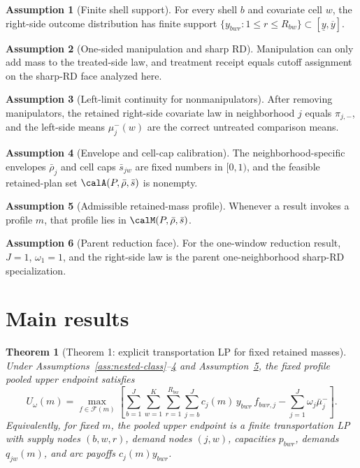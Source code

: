 \documentclass[11pt]{article}
\newcommand{\calF}{\mathcal{F}}
\theoremstyle{definition}
\newtheorem{assumption}{Assumption}
\theoremstyle{plain}
\newtheorem{theorem}{Theorem}
\theoremstyle{remark}
\begin{document}
\begin{assumption}[Finite shell support]\label{ass:finite-support}
For every shell \(b\) and covariate cell \(w\), the right-side outcome distribution has finite support
\(\{y_{bwr}:1\le r\le R_{bw}\}\subset[\underline y,\overline y]\).
\end{assumption}

\begin{assumption}[One-sided manipulation and sharp RD]\label{ass:sharp-rd}
Manipulation can only add mass to the treated-side law, and treatment receipt equals cutoff assignment on
the sharp-RD face analyzed here.
\end{assumption}

\begin{assumption}[Left-limit continuity for nonmanipulators]\label{ass:left-continuity}
After removing manipulators, the retained right-side covariate law in neighborhood \(j\) equals
\(\pi_{j,-}\), and the left-side means \(\mu^-_j(w)\) are the correct untreated comparison means.
\end{assumption}

\begin{assumption}[Envelope and cell-cap calibration]\label{ass:budgets}
The neighborhood-specific envelopes \(\bar\rho_j\) and cell caps \(\bar s_{jw}\) are fixed numbers in
\([0,1)\), and the feasible retained-plan set \(\calA(P,\bar\rho,\bar s)\) is nonempty.
\end{assumption}

\begin{assumption}[Admissible retained-mass profile]\label{ass:profile}
Whenever a result invokes a profile \(m\), that profile lies in \(\calM(P,\bar\rho,\bar s)\).
\end{assumption}

\begin{assumption}[Parent reduction face]\label{ass:parent-face}
For the one-window reduction result, \(J=1\), \(\omega_1=1\), and the right-side law is the parent
one-neighborhood sharp-RD specialization.
\end{assumption}

\section{Main results}
\begin{theorem}[Theorem 1: explicit transportation LP for fixed retained masses]\label{thm:transport}
Under Assumptions~\ref{ass:nested-class}--\ref{ass:budgets} and Assumption~\ref{ass:profile}, the fixed
profile pooled upper endpoint satisfies
\[
  U_\omega(m)=
  \max_{f\in\calF(m)}
  \left[
  \sum_{b=1}^J\sum_{w=1}^K\sum_{r=1}^{R_{bw}}\sum_{j=b}^J
  c_j(m)\,y_{bwr}\,f_{bwr,j}
  -\sum_{j=1}^J \omega_j\bar\mu^-_j
  \right].
\]
Equivalently, for fixed \(m\), the pooled upper endpoint is a finite transportation LP with supply nodes
\((b,w,r)\), demand nodes \((j,w)\), capacities \(p_{bwr}\), demands \(q_{jw}(m)\), and arc payoffs
\(c_j(m)y_{bwr}\).
\end{theorem}
\end{document}

